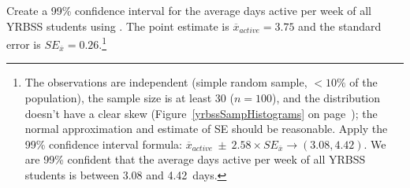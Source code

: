 \begin{spacing}{1.5}
\begin{exercise} \label{find99CIForYrbssAgeExercise}
	Create a 99\% confidence interval for the average days active per week of all YRBSS students using . The point estimate is $\overline{x}_{active} = 3.75$ and the standard error is $SE_{\overline{x}} = 0.26$.\footnote{The observations are independent (simple random sample, $<10\%$ of the population), the sample size is at least 30 ($n = 100$), and the distribution doesn't have a clear skew (Figure~\ref{yrbssSampHistograms} on page~\pageref{yrbssSampHistograms}); the normal approximation and estimate of SE should be reasonable. Apply the 99\% confidence interval formula: $\overline{x}_{active}\ \pm\ 2.58 \times  SE_{\overline{x}} \rightarrow (3.08, 4.42)$. We are 99\% confident that the average days active per week of all YRBSS students is between 3.08 and 4.42~days.}
\end{exercise}

\end{spacing}
